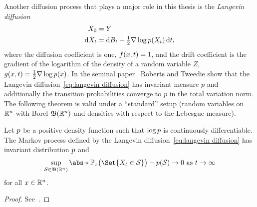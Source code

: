Another diffusion process that plays a major role in this thesis is the \emph{Langevin diffusion}
\begin{equation}
	\begin{aligned}
		X_{\num{0}} &= Y \\
		\mathrm{d}X_t &= \mathrm{d}B_t + \tfrac{1}{2}\nabla \log p (X_t)\,\mathrm{d}t,
	\end{aligned}
	\label{eq:langevin diffusion}
\end{equation}
where the diffusion coefficient is one, \( f(x, t) = \num{1} \), and the drift coefficient is the gradient of the logarithm of the density of a random variable \( Z \), \( g(x, t) = \frac{1}{2} \nabla \log p(x) \).
In the seminal paper~\cite{roberts_exponential_1996} Roberts and Tweedie show that the Langevin diffusion~\cref{eq:langevin diffusion} has invariant measure \( p \) and additionally the transition probabilities converge to \( p \) in the total variation norm.
The following theorem is valid under a \enquote{standard} setup (random variables on \( \mathbb{R}^n \) with Borel \SigmaAlgebra{} \( \mathfrak{B}(\mathbb{R}^n) \) and densities with respect to the Lebesgue measure).
\begin{theorem}
	\label{th:convergence of langevin diffusion}
	Let \( p \) be a positive density function such that \( \log p \) is continuously differentiable.
	The Markov process defined by the Langevin diffusion~\cref{eq:langevin diffusion} has invariant distribution \( p \) and
	\begin{equation}
		\sup_{\ASet \in \BorelSigma{\R^n}} \abs*{\ProbabilityMeasure_x\bigl( \Set{\RandomVariable_t \in \ASet} \bigr) - \DensityFunction(\ASet)} \to \num{0}\ \text{as}\ t \to \infty
	\end{equation}
	for all \( x \in \mathbb{R}^n \).
\end{theorem}
\begin{proof}
	See~\cite[theorem 2.1]{roberts_exponential_1996}.
\end{proof}

